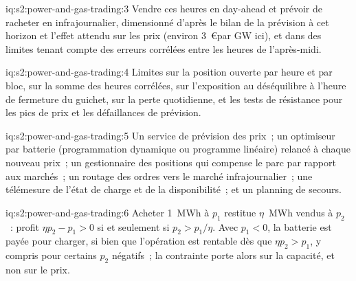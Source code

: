 \begin{solution}{iq:s2:power-and-gas-trading:3}
Vendre ces heures en day-ahead et prévoir de racheter en infrajournalier, dimensionné d'après le bilan de la prévision à cet horizon et l'effet attendu sur les prix
(environ 3~\euro par GW ici), et dans des limites tenant compte des erreurs corrélées entre les heures de l'après-midi.
\end{solution}

\begin{solution}{iq:s2:power-and-gas-trading:4}
Limites sur la position ouverte par heure et par bloc, sur la somme des heures corrélées, sur l'exposition au déséquilibre à l'heure de fermeture du guichet, sur la perte quotidienne, et les tests de résistance
pour les pics de prix et les défaillances de prévision.
\end{solution}

\begin{solution}{iq:s2:power-and-gas-trading:5}
Un service de prévision des prix~; un optimiseur par batterie (programmation dynamique ou programme linéaire) relancé à chaque nouveau prix~; un gestionnaire des positions qui
compense le parc par rapport aux marchés~; un routage des ordres vers le marché infrajournalier~; une télémesure de l'état de charge et de la disponibilité~; et un planning de secours.
\end{solution}

\begin{solution}{iq:s2:power-and-gas-trading:6}
Acheter 1~MWh à $p_1$ restitue $\eta$~MWh vendus à $p_2$~: profit $\eta p_2 - p_1 > 0$ si et seulement si $p_2 > p_1/\eta$. Avec $p_1 < 0$, la batterie est payée pour
charger, si bien que l'opération est rentable dès que $\eta p_2 > p_1$, y compris pour certains $p_2$ négatifs~; la contrainte porte alors sur la capacité, et non sur le prix.
\end{solution}
